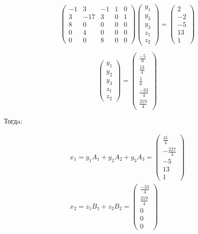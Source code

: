 \documentclass[12pt, a4paper]{article}
\begin{document}
    \begin{equation}
        \left(\begin{matrix}
            -1 & 3 & -1 & 1 & 0 \\
            3 & -17 & 3 & 0 & 1 \\
            8 & 0 & 0 & 0 & 0 \\
            0 & 4 & 0 & 0 & 0 \\
            0 & 0 & 8 & 0 & 0
        \end{matrix}\right) \begin{pmatrix}
                y_1 \\ y_2 \\ y_3 \\ z_1 \\ z_2
        \end{pmatrix} = \begin{pmatrix}
            2 \\ -2 \\ -5 \\ 13 \\ 1
        \end{pmatrix}
    \end{equation}

    \begin{equation}
        \begin{pmatrix}
            y_1 \\ y_2 \\ y_3 \\ z_1 \\ z_2
        \end{pmatrix} =
        \left(\begin{matrix}
            \frac{-5}{8} \\
            \frac{13}{4} \\
            \frac{1}{8} \\
            \frac{-33}{4} \\
            \frac{219}{4}
            \end{matrix}\right)
    \end{equation}

    Тогдa:
    
    \begin{gather}
        x_1 = y_1 A_1 + y_2 A_2 + y_3 A_3 = \begin{pmatrix}
            \frac{41}{4} \\ -\frac{227}{4} \\ -5 \\ 13 \\ 1
        \end{pmatrix} \\
        x_2 = z_1 B_1 + z_2 B_2 = \begin{pmatrix}
            \frac{-33}{4} \\
            \frac{219}{4} \\
            0 \\ 0 \\ 0
        \end{pmatrix}
    \end{gather}
\end{document}
